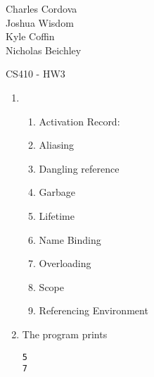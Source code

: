 \documentclass[11pt]{article}
\begin{document}
Charles Cordova \\
Joshua Wisdom \\
Kyle Coffin \\
Nicholas Beichley

CS410 - HW3
\begin{enumerate}[1.]
\item 
	\begin{enumerate}
	\item Activation Record:

	\item Aliasing

	\item Dangling reference

	\item Garbage

	\item Lifetime

	\item Name Binding

	\item Overloading

	\item Scope

	\item Referencing Environment

	\end{enumerate}

\setcounter{enumi}{4}
\item The program prints %
	\begin{alltt}
	5
	7
	\end{alltt}
\end{enumerate}
\end{document}
